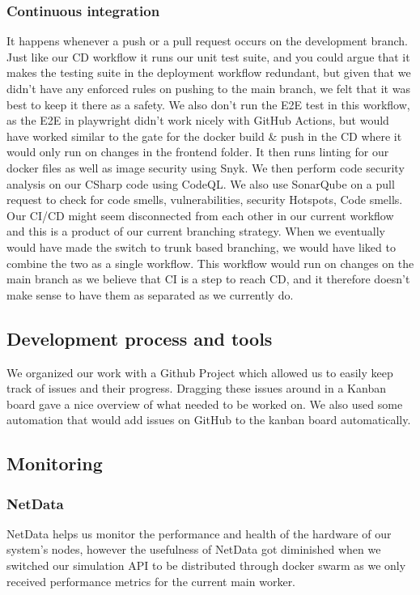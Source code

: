 \subsubsection{Continuous integration}
It happens whenever a push or a pull request occurs on the development branch. 
Just like our CD workflow it runs our unit test suite, and you could argue that it makes the testing suite in the deployment workflow redundant, but given that we didn't have any enforced rules on pushing to the main branch, we felt that it was best to keep it there as a safety. We also don't run the E2E test in this workflow, as the E2E in playwright didn't work nicely with GitHub Actions, but would have worked similar to the gate for the docker build \& push in the CD where it would only run on changes in the frontend folder.
It then runs linting for our docker files as well as image security using Snyk.
We then perform code security analysis on our CSharp code using CodeQL. We also use SonarQube on a pull request to check for code smells, vulnerabilities, security Hotspots, Code smells. Our CI/CD might seem disconnected from each other in our current workflow and this is a product of our current branching strategy. When we eventually would have made the switch to trunk based branching, we would have liked to combine the two as a single workflow. This workflow would run on changes on the main branch as we believe that CI is a step to reach CD, and it therefore doesn't make sense to have them as separated as we currently do.

\subsection{Development process and tools}
We organized our work with a Github Project which allowed us to easily keep track of issues and their progress. Dragging these issues around in a Kanban board gave a nice overview of what needed to be worked on. We also used some automation that would add issues on GitHub to the kanban board automatically.

\subsection{Monitoring}

\subsubsection{NetData}
NetData helps us monitor the performance and health of the hardware of our system's nodes, however the usefulness of NetData got diminished when we switched our simulation API to be distributed through docker swarm as we only received performance metrics for the current main worker.

